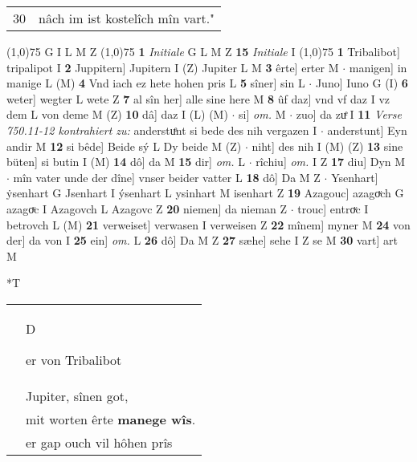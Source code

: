 \documentclass[8pt,a4paper,notitlepage]{article}
\begin{document}
\begin{table}[ht]
\begin{minipage}[t]{0.5\linewidth}
\begin{tabular}{rl}
30 & nâch im ist kostelîch mîn vart."\\ 
\end{tabular}
\scriptsize
\line(1,0){75} \newline
G I L M Z \newline
\line(1,0){75} \newline
\textbf{1} \textit{Initiale} G L M Z  \textbf{15} \textit{Initiale} I  \newline
\line(1,0){75} \newline
\textbf{1} Tribalibot] tripalipot I \textbf{2} Juppitern] Jupitern I (Z) Jupiter L M \textbf{3} êrte] erter M  $\cdot$ manigen] in manige L (M) \textbf{4} Vnd iach ez hete hohen pris L \textbf{5} sîner] sin L  $\cdot$ Juno] Iuno G (I) \textbf{6} weter] wegter L wete Z \textbf{7} al sîn her] alle sine here M \textbf{8} ûf daz] vnd vf daz I vz dem L von deme M (Z) \textbf{10} dâ] daz I (L) (M)  $\cdot$ si] \textit{om.} M  $\cdot$ zuo] da zuͤ I \textbf{11} \textit{Verse 750.11-12 kontrahiert zu:} anderstuͤnt si bede des nih vergazen I   $\cdot$ anderstunt] Eyn andir M \textbf{12} si bêde] Beide sý L Dy beide M (Z)  $\cdot$ niht] des nih I (M) (Z) \textbf{13} sine büten] si butin I (M) \textbf{14} dô] da M \textbf{15} dir] \textit{om.} L  $\cdot$ rîchiu] \textit{om.} I Z \textbf{17} diu] Dyn M  $\cdot$ mîn vater unde der dîne] vnser beider vatter L \textbf{18} dô] Da M Z  $\cdot$ Ysenhart] ẏsenhart G Jsenhart I ýsenhart L ysinhart M isenhart Z \textbf{19} Azagouc] azagoͮch G azagoͮc I Azagovch L Azagovc Z \textbf{20} niemen] da nieman Z  $\cdot$ trouc] entroͮc I betrovch L (M) \textbf{21} verweiset] verwasen I verweisen Z \textbf{22} mînem] myner M \textbf{24} von der] da von I \textbf{25} ein] \textit{om.} L \textbf{26} dô] Da M Z \textbf{27} sæhe] sehe I Z se M \textbf{30} vart] art M \newline
\end{minipage}
\hspace{0.5cm}
\begin{minipage}[t]{0.5\linewidth}
\small
\begin{center}*T
\end{center}
\begin{tabular}{rl}
 & \begin{large}D\end{large}er von Tribalibot\\ 
 & Jupiter, sînen got,\\ 
 & mit worten êrte \textbf{manege wîs}.\\ 
 & er gap ouch vil hôhen prîs\\ 

\end{tabular}
\end{minipage}
\end{table}
\end{document}
